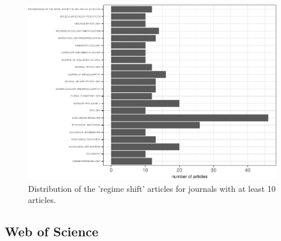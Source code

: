 \documentclass[12pt,twoside,openany]{reedthesis}
\begin{document}
\begin{figure}

{\centering \includegraphics[width=0.85\linewidth]{_myDissertation_files/figure-latex/wosRegimePubsByJrnlmin10Pubs-1} 

}

\caption{Distribution of the 'regime shift' articles for journals with at least 10 articles.}\label{fig:wosRegimePubsByJrnlmin10Pubs}
\end{figure}
\hypertarget{web-of-science-1}{%
\subsection{Web of Science}\label{web-of-science-1}}
\end{document}
